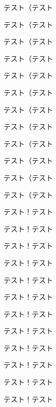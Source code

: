 \documentclass{jarticle}
\begin{document}
テスト\linebreak（テスト\par
テスト\linebreak[4]（テスト\par
テスト\linebreak[3]（テスト\par
テスト\linebreak[2]（テスト\par
テスト\linebreak[1]（テスト\par
テスト\linebreak[0]（テスト\par
テスト\nolinebreak（テスト\par
テスト\nolinebreak[4]（テスト\par
テスト\nolinebreak[3]（テスト\par
テスト\nolinebreak[2]（テスト\par
テスト\nolinebreak[1]（テスト\par
テスト\nolinebreak[0]（テスト\par
テスト\linebreak！テスト\par
テスト\linebreak[4]！テスト\par
テスト\linebreak[3]！テスト\par
テスト\linebreak[2]！テスト\par
テスト\linebreak[1]！テスト\par
テスト\linebreak[0]！テスト\par
テスト\nolinebreak！テスト\par
テスト\nolinebreak[4]！テスト\par
テスト\nolinebreak[3]！テスト\par
テスト\nolinebreak[2]！テスト\par
テスト\nolinebreak[1]！テスト\par
テスト\nolinebreak[0]！テスト\par
\end{document}
